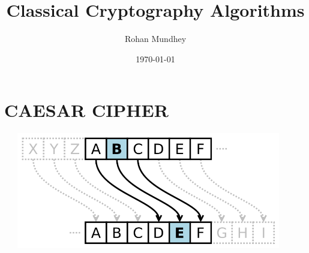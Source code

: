 \documentclass[11pt]{article}
\begin{document}
\tableofcontents
\title{Classical Cryptography Algorithms}
\author{Rohan Mundhey}
\date{\today}
\maketitle



\section{\textbf{CAESAR CIPHER}}

\includegraphics[width=5in,height=2in]{caesar_cipher.png}
\end{document}
